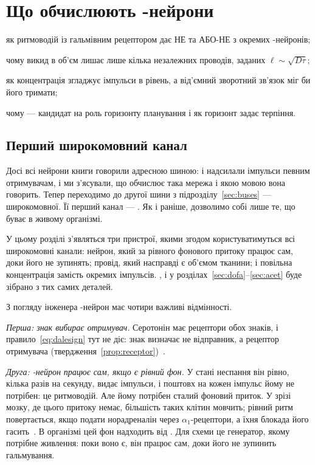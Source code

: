 \chapter{Що обчислюють -нейрони}
\label{sec:serocomputer}
\begin{chaptergoals}
\item як ритмоводій із гальмівним рецептором дає НЕ та АБО-НЕ з окремих -нейронів;
\item чому викид в об'єм лишає лише кілька незалежних проводів, заданих $\ell\sim\sqrt{D\tau}$;
\item як концентрація згладжує імпульси в рівень, а від'ємний зворотний зв'язок міг би його тримати;
\item чому  --- кандидат на роль горизонту планування і як горизонт задає терпіння.
\end{chaptergoals}

\section{Перший широкомовний канал}

Досі всі нейрони книги говорили адресною шиною:  і  надсилали імпульси певним отримувачам, і ми з'ясували, що обчислює така мережа і якою мовою вона говорить. Тепер переходимо до другої шини з підрозділу~\ref{sec:buses} --- широкомовної. Її перший канал --- . Як і раніше, дозволимо собі лише те, що буває в живому організмі.

У цьому розділі з'являться три пристрої, якими згодом користуватимуться всі широкомовні канали: нейрон, який за рівного фонового притоку працює сам, доки його не зупинять; провід, який насправді є об'ємом тканини; і повільна концентрація замість окремих імпульсів. ,  і  у розділах~\ref{sec:dofa}--\ref{sec:acet} буде зібрано з тих самих деталей.

З погляду інженера -нейрон має чотири важливі відмінності.

\emph{Перша: знак вибирає отримувач.} Серотонін має рецептори обох знаків, і правило~\eqref{eq:dalesign} тут не діє: знак визначає не відправник, а рецептор отримувача (твердження~\ref{prop:receptor})~\cite{BarnesSharp1999}.

\emph{Друга: -нейрон працює сам, якщо є рівний фон.} У стані неспання він рівно, кілька разів на секунду, видає імпульси, і поштовх на кожен імпульс йому не потрібен: це ритмоводій. Але йому потрібен сталий фоновий приток. У зрізі мозку, де цього притоку немає, більшість таких клітин мовчить; рівний ритм повертається, якщо подати норадреналін через $\alpha_1$-рецептори, а їхня блокада його гасить~\cite{VandermaelenAghajanian1983}. В організмі цей фон надходить від . Для схеми це генератор, якому потрібне живлення: поки воно є, він працює сам, доки його не зупинить гальмування.

